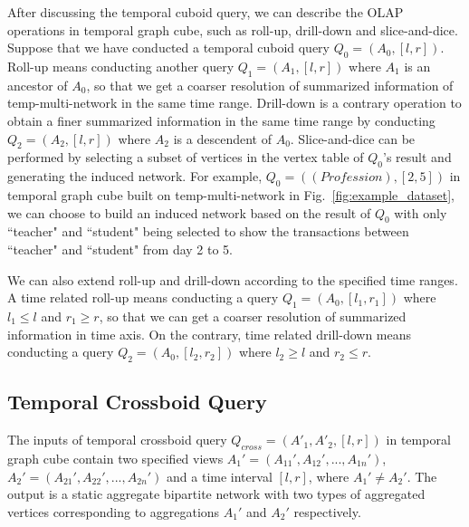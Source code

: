 \documentclass[10pt,journal,compsoc]{IEEEtran}
\begin{document}
After discussing the temporal cuboid query, we can describe the OLAP operations in temporal graph cube, such as roll-up, drill-down and slice-and-dice. Suppose that we have conducted a temporal cuboid query $ Q_0=(A_0,[l,r]) $. Roll-up means conducting another query $ Q_1=(A_1,[l,r]) $ where $ A_1 $ is an ancestor of $ A_0 $, so that we get a coarser resolution of summarized information of temp-multi-network in the same time range. Drill-down is a contrary operation to obtain a finer summarized information in the same time range by conducting $ Q_2=(A_2,[l,r]) $ where $ A_2 $ is a descendent of $ A_0 $. Slice-and-dice can be performed by selecting a subset of vertices in the vertex table of $ Q_0 $'s result and generating the induced network. For example, $ Q_0=((Profession),[2,5]) $ in temporal graph cube built on temp-multi-network in Fig.~\ref{fig:example_dataset}, we can choose to build an induced network based on the result of $ Q_0 $ with only ``teacher" and ``student" being selected to show the transactions between ``teacher" and ``student" from day 2 to 5.

We can also extend roll-up and drill-down according to the specified time ranges. A time related roll-up means conducting a query $ Q_1=(A_0,[l_1,r_1]) $ where $ l_1 \leq l $ and $ r_1 \geq r $, so that we can get a coarser resolution of summarized information in time axis. On the contrary, time related drill-down means conducting a query $ Q_2=(A_0,[l_2,r_2]) $ where $ l_2 \geq l $ and $ r_2 \leq r $.

\subsection{Temporal Crossboid Query} \label{subsec:crossboid}
The inputs of temporal crossboid query $ Q_{cross}=(A'_1,A'_2,[l,r]) $ in temporal graph cube contain two specified views $ A_1'=(A_{11}',A_{12}',...,A_{1n}') $, $ A_2'=(A_{21}',A_{22}',...,A_{2n}') $ and a time interval $ [l,r] $, where $ A_1' \neq A_2' $. The output is a static aggregate bipartite network with two types of aggregated vertices corresponding to aggregations $ A_1' $ and $ A_2' $ respectively. %
\end{document}
